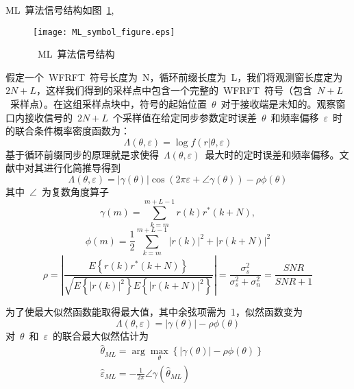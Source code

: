 ML~算法信号结构如图~\ref{ML_symbol_figure},
\begin{figure}[htbp]
\centering
\texttt{[image: ML\_symbol\_figure.eps]}
\caption{~ML~算法信号结构}\vspace{-1em}\label{ML_symbol_figure}
\end{figure}
假定一个~WFRFT~符号长度为~N，循环前缀长度为~L，我们将观测窗长度定为~$2N+L$，这样我们得到的采样点中包含一个完整的~WFRFT~符号（包含~$N+L$~采样点）。在这组采样点块中，符号的起始位置~$\theta$~对于接收端是未知的。观察窗口内接收信号的~$2N+L$~个采样值在给定同步参数定时误差~$\theta$~和频率偏移~$\varepsilon$~时的联合条件概率密度函数为：
\begin{equation}
\Lambda \left( {\theta ,\varepsilon } \right) = \log f\left( {r|\theta ,\varepsilon } \right)
\end{equation}
基于循环前缀同步的原理就是求使得~$\Lambda \left( {\theta ,\varepsilon } \right)$~最大时的定时误差和频率偏移。文献\cite{Jan1997ML}中对其进行化简推导得到
\begin{equation}
\Lambda \left( {\theta ,\varepsilon } \right) = \left| {\gamma \left( \theta  \right)} \right|\cos \left( {2\pi \varepsilon  + \angle \gamma \left( \theta  \right)} \right) - \rho \phi \left( \theta  \right)
\end{equation}
其中~$\angle$~为复数角度算子
\begin{equation}
\gamma \left( m \right) = \sum\limits_{k = m}^{m + L - 1} {r\left( k \right){r^*}\left( {k + N} \right)} ,
\end{equation}
\begin{equation}
\phi \left( m \right) = \frac{1}{2}\sum\limits_{k = m}^{m + L - 1} {{{\left| {r\left( k \right)} \right|}^2} + {{\left| {r\left( {k + N} \right)} \right|}^2}}
\end{equation}
\begin{equation}
\rho  = \left| {\frac{{E\left\{ {r\left( k \right){r^*}\left( {k + N} \right)} \right\}}}{{\sqrt {E\left\{ {{{\left| {r\left( k \right)} \right|}^2}} \right\}E\left\{ {{{\left| {r\left( {k + N} \right)} \right|}^2}} \right\}} }}} \right| = \frac{{\sigma _s^2}}{{\sigma _s^2 + \sigma _n^2}} = \frac{{SNR}}{{SNR + 1}}
\end{equation}

为了使最大似然函数能取得最大值，其中余弦项需为~1，似然函数变为
\begin{equation}
\Lambda \left( {\theta ,\varepsilon } \right) = \left| {\gamma \left( \theta  \right)} \right| - \rho \phi \left( \theta  \right)
\end{equation}
对~$\theta$~和~$\varepsilon$~的联合最大似然估计为
\begin{align}
&{\hat \theta _{ML}} = \arg \mathop {\max }\limits_\theta  \left\{ {\left| {\gamma \left( \theta  \right)} \right| - \rho \phi \left( \theta  \right)} \right\} \\
&{\hat \varepsilon _{ML}} =  - \frac{1}{{2\pi }}\angle \gamma \left( {{{\hat \theta }_{ML}}} \right)
\end{align}

